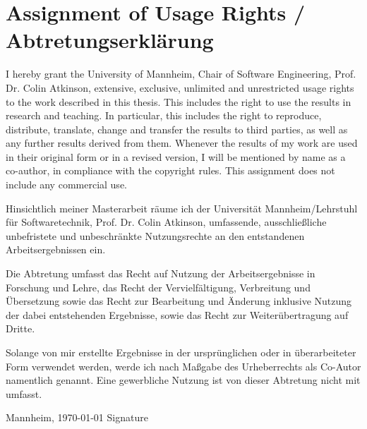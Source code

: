 \chapter*{\large Assignment of Usage Rights / Abtretungserkl\"arung}
\pagestyle{empty}
I hereby grant the University of Mannheim, Chair of Software Engineering, Prof. Dr. Colin Atkinson, extensive, exclusive, unlimited and unrestricted usage rights to the work described in this thesis. 
This includes the right to use the results in research and teaching. In particular, this includes the right to reproduce, distribute, translate, change and transfer the results to third parties, as well as any further results derived from them.
Whenever the results of my work are used in their original form or in a revised version, I will be mentioned by name as a co-author, in compliance with the copyright rules. This assignment does not include any commercial use.

\vspace{-0.3cm}

\hrulefill

\vspace{-0.2cm} 
Hinsichtlich meiner Masterarbeit räume ich der Universität Mannheim/Lehrstuhl für Softwaretechnik,
Prof. Dr. Colin Atkinson, umfassende, ausschließliche unbefristete und
unbeschränkte Nutzungsrechte an den entstandenen Arbeitsergebnissen ein.

Die Abtretung umfasst das Recht auf Nutzung der Arbeitsergebnisse in Forschung
und Lehre, das Recht der Vervielfältigung, Verbreitung und Übersetzung sowie
das Recht zur Bearbeitung und Änderung inklusive Nutzung der dabei
entstehenden Ergebnisse, sowie das Recht zur Weiterübertragung auf Dritte.

Solange von mir erstellte Ergebnisse in der ursprünglichen oder in
überarbeiteter Form verwendet werden, werde ich nach Maßgabe des Urheberrechts
als Co-Autor namentlich genannt. Eine gewerbliche Nutzung ist von dieser
Abtretung nicht mit umfasst.
\bigskip

\vspace{2.0cm}

Mannheim, \today \hspace{7cm} Signature\\

